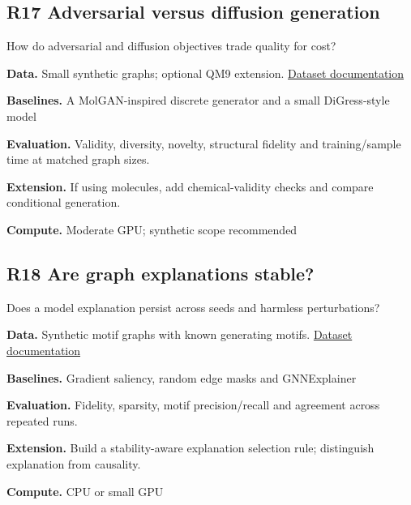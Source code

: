\documentclass[11pt,letterpaper]{article}
\begin{document}
\begin{minipage}{\linewidth}\subsection*{R17 Adversarial versus diffusion generation}
How do adversarial and diffusion objectives trade quality for cost?\par\textbf{Data.} Small synthetic graphs; optional QM9 extension. \href{https://pytorch-geometric.readthedocs.io/en/latest/generated/torch_geometric.datasets.QM9.html}{Dataset documentation}\par
\textbf{Baselines.} A MolGAN-inspired discrete generator and a small DiGress-style model\par
\textbf{Evaluation.} Validity, diversity, novelty, structural fidelity and training/sample time at matched graph sizes.\par
\textbf{Extension.} If using molecules, add chemical-validity checks and compare conditional generation.\par
\textbf{Compute.} Moderate GPU; synthetic scope recommended\par
\end{minipage}\par\vspace{8pt}
\begin{minipage}{\linewidth}\subsection*{R18 Are graph explanations stable?}
Does a model explanation persist across seeds and harmless perturbations?\par\textbf{Data.} Synthetic motif graphs with known generating motifs. \href{https://pytorch-geometric.readthedocs.io/en/latest/generated/torch_geometric.datasets.BAShapes.html}{Dataset documentation}\par
\textbf{Baselines.} Gradient saliency, random edge masks and GNNExplainer\par
\textbf{Evaluation.} Fidelity, sparsity, motif precision/recall and agreement across repeated runs.\par
\textbf{Extension.} Build a stability-aware explanation selection rule; distinguish explanation from causality.\par
\textbf{Compute.} CPU or small GPU\par
\end{minipage}\par\vspace{8pt}
\end{document}
